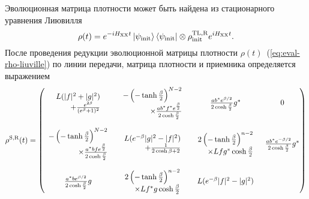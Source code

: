 Эволюционная матрица плотности может быть найдена из стационарного уравнения Лиювилля
\begin{equation}\label{eq:eval-rho-liuville}
  \rho(t) = e^{-iH_\mathrm{XX}t}
    \left| \psi_\mathrm{init} \right\rangle \left\langle \psi_\mathrm{init} \right|
    \otimes
    \rho^\mathrm{TL, R}_\mathrm{init}
    e^{iH_\mathrm{XX}t}.
\end{equation}
После проведения редукции эволюционной матрицы плотности $\rho(t)$~(\ref{eq:eval-rho-liuville}) по линии передачи,
матрица плотности и приемника определяется выражением
%
\small
\begin{equation}\label{eq:eval-rho-sr}
\rho^\mathrm{S,R}(t) =
\begin{pmatrix}
  \begin{array}{r}
    L(|f|^2+|g|^2) \\
    + \frac{e^{2\beta}}{(e^{\beta}+1)^2}
  \end{array}
  &
  \begin{array}{r}
    -\left( -\tanh\frac{\beta}{2} \right)^{N-2} \\
    \times \frac{ab^*f^* e^{\frac{\beta}{2}}}{2\cosh\frac{\beta}{2}}
  \end{array}
  &
  \frac{ab^* e^{\beta /2}}{2\cosh\frac{\beta}{2}}g^*
  &
  0\\
  &
  &
  &\\
  \begin{array}{r}
    -\left( -\tanh\frac{\beta}{2} \right)^{N-2} \\
    \times\frac{a^*bf e^{\frac{\beta}{2}}}{2\cosh\frac{\beta}{2}}
  \end{array}
  &
  \begin{array}{r}
    L(e^{-\beta}|g|^2-|f|^2) \\
    +\frac{1}{2\cosh{\beta}+2}
  \end{array}
  &
  \begin{array}{r}
    {2\left( -\tanh\frac{\beta}{2} \right)^{n-2}}\\
    \times Lfg^*\cosh\frac{\beta}{2}
  \end{array}
  &
  \frac{ab^* e^{-\beta/2}}{2\cosh\frac{\beta}{2}}g^* \\
  &
  &
  &\\
  \frac{a^*b e^{\beta /2}}{2\cosh\frac{\beta}{2}}g
  &
  \begin{array}{r}
   2\left( -\tanh\frac{\beta}{2} \right)^{n-2}\\ \times{Lf^*g\cosh\frac{\beta}{2}}
  \end{array}
  &
  \begin{array}{r}
    L(e^{-\beta}|f|^2 -|g|^2) \\

\end{array}
\end{pmatrix}
\end{equation}
